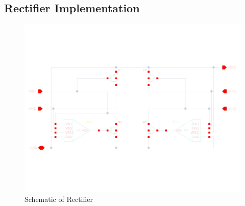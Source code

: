 \documentclass[12pt,a4paper,UKenglish]{report}
\begin{document}
\begin{appendices} 	%
\makeatletter
{}
\makeatother

\chapter{Rectifier Implementation}

\begin{figure} [!htbp]
 	\centering
  	\includegraphics[width=\textwidth]{appendix/schematic_rectifier_l.pdf} 
 	\caption{Schematic of Rectifier} 
	\label{fig:appen_schematic_rectifer} 
\end{figure}




\end{appendices}
\end{document}
